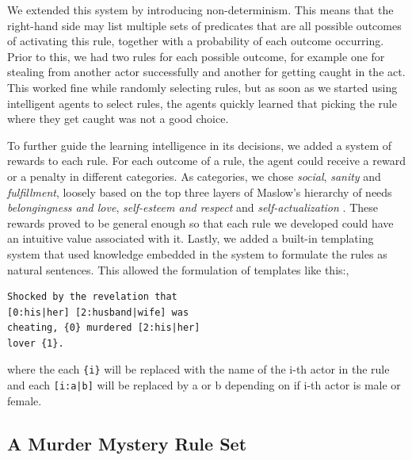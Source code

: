 We extended this system by introducing non-determinism. This means that the right-hand side may list multiple sets of predicates that are all possible outcomes of activating this rule, together with a probability of each outcome occurring. Prior to this, we had two rules for each possible outcome, for example one for stealing from another actor successfully and another for getting caught in the act. This worked fine while randomly selecting rules, but as soon as we started using intelligent agents to select rules, the agents quickly learned that picking the rule where they get caught was not a good choice.

To further guide the learning intelligence in its decisions, we added a system of rewards to each rule. For each outcome of a rule, the agent could receive a reward or a penalty in different categories.
As categories, we chose \emph{social}, \emph{sanity} and \emph{fulfillment}, loosely based on the top three layers of Maslow's hierarchy of needs \emph{belongingness and love}, \emph{self-esteem and respect} and \emph{self-actualization} \cite{maslow_1943}.
These rewards proved to be general enough so that each rule we developed could have an intuitive value associated with it.
Lastly, we added a built-in templating system that used knowledge embedded in the system to formulate the rules as natural sentences.
This allowed the formulation of templates like this:,
\begin{lstlisting}
Shocked by the revelation that
[0:his|her] [2:husband|wife] was
cheating, {0} murdered [2:his|her]
lover {1}.
\end{lstlisting}
where the each \lstinline|{i}| will be replaced with the name of the i-th actor in the rule and each \lstinline{[i:a|b]} will be replaced by a or b depending on if i-th actor is male or female.

\subsection{A Murder Mystery Rule Set}

